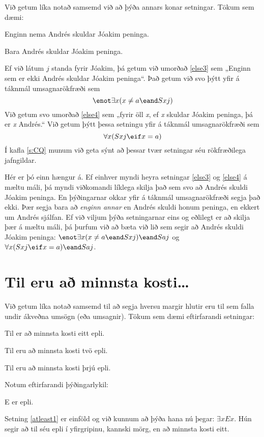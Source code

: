 Við getum líka notað samsemd við að þýða annars konar setningar. Tökum sem dæmi:

\begin{earg}
\item[\ex{else3}] Enginn nema Andrés skuldar Jóakim peninga.
\item[\ex{else4}] Bara Andrés skuldar Jóakim peninga.
\end{earg}
Ef við látum $j$ standa fyrir Jóakim, þá getum við umorðað \ref{else3} sem „Enginn sem er ekki Andrés skuldar Jóakim peninga“. Það getum við svo þýtt yfir á táknmál umsagnarökfræði sem $$\enot\exists x(x \neq a \eand Sxj)$$ Við getum svo umorðað \ref{else4} sem „fyrir öll \emph{x}, ef \emph{x} skuldar Jóakim peninga, þá er \emph{x} Andrés.“ Við getum þýtt þessa setningu yfir á táknmál umsagnarökfræði sem $$\forall x (Sxj \eif x = a)$$ Í kafla \ref{s:CQ} munum við geta sýnt að þessar tvær setningar séu rökfræðilega jafngildar.

Hér er þó einn hængur á. Ef einhver myndi heyra setningar \ref{else3} og \ref{else4} á mæltu máli, þá myndi viðkomandi líklega skilja það sem svo að Andrés skuldi Jóakim peninga. En þýðingarnar okkar yfir á táknmál umsagnarökfræði segja það ekki. Þær segja bara að \emph{enginn annar} en Andrés skuldi honum peninga, en ekkert um Andrés sjálfan. Ef við viljum þýða setningarnar eins og eðlilegt er að skilja þær á mæltu máli, þá þurfum við að bæta við lið sem segir að Andrés skuldi Jóakim peninga: $\enot\exists x(x \neq a \eand Sxj) \eand Saj$ og $\forall x (Sxj \eif x = a) \eand Saj$.

\section{Til eru að minnsta kosti\ldots}
Við getum líka notað samsemd til að segja hversu margir hlutir eru til sem falla undir ákveðna umsögn (eða umsagnir). Tökum sem dæmi eftirfarandi setningar:

\begin{earg}
\item[\ex{atleast1}] Til er að minnsta kosti eitt epli.
\item[\ex{atleast2}] Til eru að minnsta kosti tvö epli.
\item[\ex{atleast3}] Til eru að minnsta kosti þrjú epli.
\end{earg}
Notum eftirfarandi þýðingarlykil:
	\begin{ekey}
		\item[E]  er epli.
	\end{ekey}
Setning \ref{atleast1} er einföld og við kunnum að þýða hana nú þegar: $\exists x Ex$. Hún segir að til séu epli í yfirgripinu, kannski mörg, en að minnsta kosti eitt.

